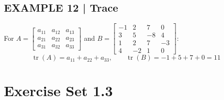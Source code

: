 \documentclass{article}
\theoremstyle{mystyle}
\begin{document}
\subsection*{EXAMPLE 12 | Trace}
For $A=\begin{bmatrix}a_{11}&a_{12}&a_{13}\\a_{21}&a_{22}&a_{23}\\a_{31}&a_{32}&a_{33}\end{bmatrix}$ and $B=\begin{bmatrix}-1&2&7&0\\3&5&-8&4\\1&2&7&-3\\4&-2&1&0\end{bmatrix}$:
\[
\operatorname{tr}(A)=a_{11}+a_{22}+a_{33},\qquad \operatorname{tr}(B)=-1+5+7+0=11
\]

\section*{Exercise Set 1.3}
\end{document}
